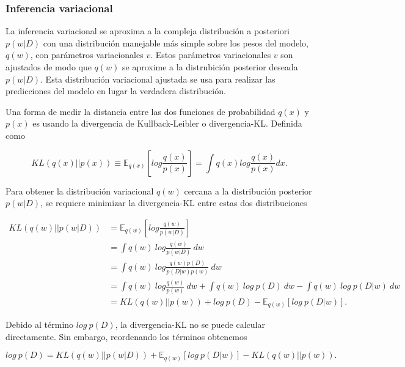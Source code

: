 \documentclass[10pt, oneside, a4paper]{article}
\begin{document}
	\subsubsection{Inferencia variacional}

	La inferencia variacional se aproxima a la compleja distribución a posteriori $p(w|D)$ con una distribución manejable más simple sobre los pesos del modelo, $q(w)$, con parámetros variacionales $v$. Estos parámetros variacionales $v$ son ajustados de modo que $q(w)$ se aproxime a la distrubición posterior deseada $p(w|D)$. Esta distribución variacional ajustada se usa para realizar las predicciones del modelo en lugar la verdadera distribución.
	
	Una forma de medir la distancia entre las dos funciones de probabilidad $q(x)$ y $p(x)$ es usando la divergencia de Kullback-Leibler o divergencia-KL. Definida como
	
	\begin{equation} \label{eq:5}
	KL(q(x)||p(x)) \equiv \mathbb{E}_{q(x)}  \left[log\frac{q(x)}{p(x)}\right]  = \int q(x) log \frac{q(x)}{p(x)} dx.
	\end{equation}

	Para obtener la distribución variacional $q(w)$ cercana a la distribución posterior $p(w|D)$, se requiere minimizar la divergencia-KL entre estas dos distribuciones
	
	\begin{equation} \label{eq:6}
		\begin{split}
			KL(q(w)||p(w|D)) & = \mathbb{E}_{q(w)}  \left[log\frac{q(w)}{p(w|D)}\right]  \\
			& = \int q(w) \: log \frac{q(w)}{p(w|D)} \: dw \\
			& = \int q(w) \: log \frac{q(w) p(D)}{p(D|w) p(w)} \:dw \\
			& = \int q(w) \: log \frac{q(w)}{p(w)} \: dw + \int q(w) \: log \: p(D) \: dw - \int q(w) \: log \: p(D|w) \: dw \\
			& = KL(q(w)||p(w)) + log \: p(D) - \mathbb{E}_{q(w)} [log \: p(D|w)].
		\end{split}
	\end{equation}
	
	Debido al término $log \: p(D)$, la divergencia-KL no se puede calcular directamente. Sin embargo, reordenando los términos obtenemos
	
	\begin{equation} \label{eq:7}
	log \: p(D)  = KL(q(w)||p(w|D)) + \mathbb{E}_{q(w)} [log \: p(D|w)] - KL(q(w)||p(w)).
	\end{equation}	
\end{document}
